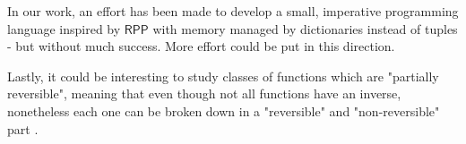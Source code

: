 \documentclass[oneside]{book}
\theoremstyle{definition}
\theoremstyle{remark}
\theoremstyle{plain}
\newcommand{\RPP}{\mathsf{RPP}}
\begin{document}
In our work, an effort has been made to develop a small, imperative programming language
inspired by $\RPP$ with memory managed by dictionaries instead of tuples - but without much success.
More effort could be put in this direction.

Lastly, it could be interesting to study classes of functions which are "partially reversible",
meaning that even though not all functions have an inverse, nonetheless each one can be broken down
in a "reversible" and "non-reversible" part \cite{DBLP:conf/rc/MatosPR21}.



\end{document}

